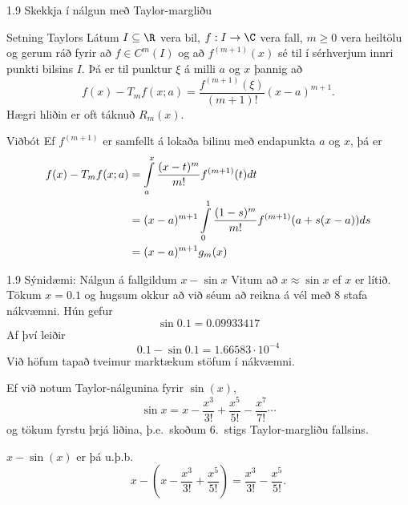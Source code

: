 %
\begin{frame}{1.9 Skekkja í nálgun með Taylor-margliðu} 

\begin{block}{Setning Taylors} Látum $I \subseteq \R$ vera bil, $f : I \to
\C$ vera fall, $m \geq 0$ vera heiltölu og gerum ráð fyrir að $f \in
C^m(I)$ og að $f^{(m+1)}(x)$ sé til í sérhverjum innri punkti bilsins
$I$.  Þá er til punktur $\xi$ á milli $a$ og $x$
þannig að 
\begin{equation*}
  f(x) - T_mf(x;a)= \frac{f^{(m+1)}(\xi)}{(m+1)!}(x-a)^{m+1}.
\end{equation*}
Hægri hliðin er oft táknuð $R_m(x)$.
\end{block}

\pause

\begin{block}{Viðbót}
Ef $f^{(m+1)}$ er samfellt á lokaða bilinu með endapunkta $a$ og $x$,
þá er
\begin{align*}
  f(x) - T_mf(x;a)&= \int\limits_a^x 
  \frac{(x-t)^m}{m!}f^{(m+1)}(t) dt \notag \\
  &= (x-a)^{m+1} \int\limits_0^1 
  \frac{(1-s)^m}{m!} f^{(m+1)}(a + s(x-a)) ds\\
&= (x-a)^{m+1}g_m(x)
\end{align*}
\end{block}

\end{frame}
%
\begin{frame}{1.9 Sýnidæmi: Nálgun á fallgildum $x-\sin x$} 
Vitum að $x \approx \sin x$ ef $x$ er lítið. \pause 
Tökum $x=0.1$ og hugsum okkur að
við séum að reikna á vél með 8 stafa nákvæmni.     \pause Hún gefur 
\begin{equation*}
    \sin 0.1 = 0.09933417
\end{equation*}\pause
Af því leiðir
\begin{equation*}
    0.1 - \sin 0.1 = 1.66583\cdot 10^{-4}
\end{equation*}
Við höfum tapað tveimur marktækum stöfum í nákvæmni. 

Ef við notum Taylor-nálgunina fyrir $\sin(x)$,
\begin{equation*}
    \sin x = x - \frac{x^3}{3!} + \frac{x^5}{5!} 
    - \frac{x^7}{7!} \cdots
\end{equation*}
og tökum fyrstu þrjá liðina, þ.e.~skoðum 6.~stigs Taylor-margliðu fallsins. \pause


$x-\sin(x)$ er þá u.þ.b.
$$
x - \left(x - \frac{x^3}{3!} + \frac{x^5}{5!}\right) = \frac{x^3}{3!} - \frac{x^5}{5!}.
$$
\end{frame}

